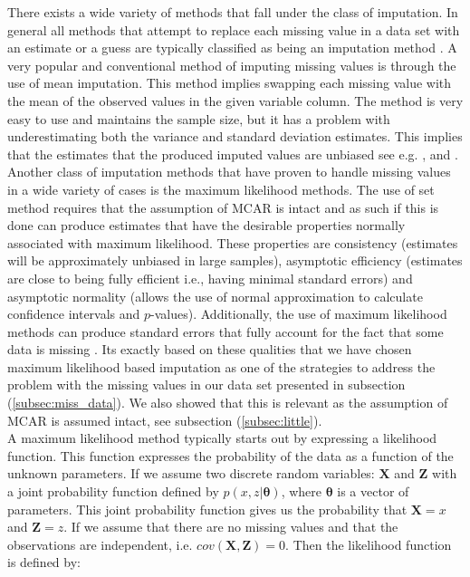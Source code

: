 \documentclass[../thesis.tex]{subfiles}
\begin{document}
\noindent There exists a wide variety of methods that fall under the class of imputation. In general all methods that attempt to replace each missing value in a data set with an estimate or a guess are typically classified as being an imputation method \citep{allison1999missing}. A very popular and conventional method of imputing missing values is through the use of mean imputation. This method implies swapping each missing value with the mean of the observed values in the given variable column. The method is very easy to use and maintains the sample size, but it has a problem with underestimating both the variance and standard deviation estimates. This implies that the estimates that the produced imputed values are unbiased see e.g. \cite{scheffer2002dealing}, \cite{enders2010applied} and \cite{eekhout2012brief}. Another class of imputation methods that have proven to handle missing values in a wide variety of cases is the maximum likelihood methods. The use of set method requires that the assumption of MCAR is intact and as such if this is done can produce estimates that have the desirable properties normally associated with maximum likelihood. These properties are consistency (estimates will be approximately unbiased in large samples), asymptotic efficiency (estimates are close to being fully efficient i.e., having minimal standard errors) and asymptotic normality (allows the use of normal approximation to calculate confidence intervals and $p$-values). Additionally, the use of maximum likelihood methods can produce standard errors that fully account for the fact that some data is missing \citep{allison1999missing}. Its exactly based on these qualities that we have chosen maximum likelihood based imputation as one of the strategies to address the problem with the missing values in our data set presented in subsection (\ref{subsec:miss_data}). We also showed that this is relevant as the assumption of MCAR is assumed intact, see subsection (\ref{subsec:little}).\\
\indent A maximum likelihood method typically starts out by expressing a likelihood function. This function expresses the probability of the data as a function of the unknown parameters. If we assume two discrete random variables: $\mathbf{X}$ and $\mathbf{Z}$ with a joint probability function defined by $p(x,z|\boldsymbol{\theta})$, where $\boldsymbol{\theta}$ is a vector of parameters. This joint probability function gives us the probability that $\mathbf{X} = x$ and $\mathbf{Z} = z$. If we assume that there are no missing values and that the observations are independent, i.e. $cov(\mathbf{X}, \mathbf{Z}) = 0$. Then the likelihood function is defined by:
\end{document}
